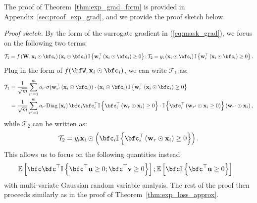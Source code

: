 \documentclass[10pt]{article} %
\theoremstyle{definition}
\theoremstyle{plain}
\newcommand{\paren}[1]{\left(#1\right)}
\providecommand{\E}{\mathbb{E}}
\def\bfu{{\mathbf{u}}}\def\bfv{{\mathbf{v}}}\def\bfw{{\mathbf{w}}}\def\bfx{{\mathbf{x}}}
\begin{document}
The proof of Theorem~\ref{thm:exp_grad_form} is provided in Appendix~\ref{sec:proof_exp_grad}, and we provide the proof sketch below.

\textit{Proof sketch.} By the form of the surrogate gradient in (\ref{eq:mask_grad}), we focus on the following two terms:
\begin{align*}
    \mathcal{T}_1= f\paren{\mathbf{W},\bfx_i\odot\bfc_i}\paren{\bfx_i\odot\bfc_i}\mathbb{I}\left\{\bfw_r^\top\paren{\bfx_i\odot\bfc_i}\geq 0\right\};  \mathcal{T}_2= y_i\paren{\bfx_i\odot\bfc_i}\mathbb{I}\left\{\bfw_r^\top\paren{\bfx_i\odot\bfc_i}\geq 0\right\}.
\end{align*}
Plug in the form of $f(\bfW,\bfx_i\odot\bfc_i)$, we can write $\mathcal{T}_1$ as:
\begin{align*}
    \mathcal{T}_1 &= \frac{1}{\sqrt{m}}\sum_{r'=1}^ma_{r'} \sigma(\bfw_{r'}^\top\paren{\bfx_i\odot\bfc_i})\cdot\paren{\bfx_i\odot\bfc_i}\mathbb{I}\left\{\bfw_r^\top\paren{\bfx_i\odot\bfc_i}\geq 0\right\}\\
    & = \frac{1}{\sqrt{m}}\sum_{r'=1}^ma_{r'}\text{Diag}\paren{\bfx_i}\bfc_i\bfc_i^\top\mathbb{I}\left\{\bfc_i^\top\paren{\bfw_r\odot\bfx_i}\geq 0\right\}\cdot \mathbb{I}\left\{\bfc_i^\top\paren{\bfw_{r'}\odot\bfx_i\geq 0}\right\}\paren{\bfw_{r'}\odot\bfx_i},
\end{align*}
while $\mathcal{T}_2$ can be written as:
\[
    \mathcal{T}_2 = y_i\bfx_i\odot \paren{\bfc_i\mathbb{I}\left\{\bfc_i^\top\paren{\bfw_r\odot\bfx_i}\geq 0\right\}}.
\]
This allows us to focus on the following quantities instead
\begin{align*}
\E&\left[\bfc\bfc^\top\mathbb{I}\left\{\bfc^\top\bfu\geq 0;\bfc^\top\bfv\geq 0\right\}\right];  \E \left[\bfc\mathbb{I}\left\{\bfc^\top\bfu\geq 0\right\}\right]
\end{align*}
with multi-variate Gaussian random variable analysis. The rest of the proof then proceeds similarly as in the proof of Theorem~\ref{thm:exp_loss_approx}.
\end{document}
